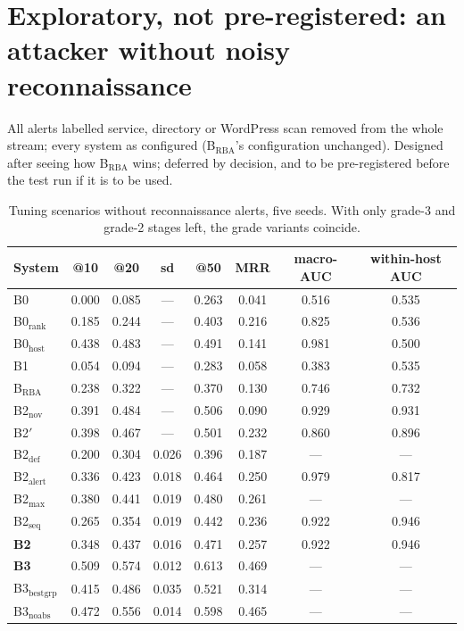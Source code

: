 \documentclass[10.5pt,a4paper]{article}
\begin{document}
\section{Exploratory, not pre-registered: an attacker without noisy reconnaissance}
All alerts labelled service, directory or WordPress scan removed from the whole stream; every system as configured (B$_\mathrm{RBA}$'s configuration unchanged). Designed after seeing how B$_\mathrm{RBA}$ wins; deferred by decision, and to be pre-registered before the test run if it is to be used.
\begin{table}[h]\centering\small
\caption{Tuning scenarios without reconnaissance alerts, five seeds. With only grade-3 and grade-2 stages left, the grade variants coincide.}
\label{tab:noscan}
\begin{tabular}{@{}l cccccc c@{}}
\toprule
System & @10 & @20 & sd & @50 & MRR & macro-AUC & within-host AUC \\
\midrule
B0 & 0.000 & 0.085 & --- & 0.263 & 0.041 & 0.516 & 0.535 \\
B0$_\mathrm{rank}$ & 0.185 & 0.244 & --- & 0.403 & 0.216 & 0.825 & 0.536 \\
B0$_\mathrm{host}$ & 0.438 & 0.483 & --- & 0.491 & 0.141 & 0.981 & 0.500 \\
B1 & 0.054 & 0.094 & --- & 0.283 & 0.058 & 0.383 & 0.535 \\
B$_\mathrm{RBA}$ & 0.238 & 0.322 & --- & 0.370 & 0.130 & 0.746 & 0.732 \\
B2$_\mathrm{nov}$ & 0.391 & 0.484 & --- & 0.506 & 0.090 & 0.929 & 0.931 \\
B2$'$ & 0.398 & 0.467 & --- & 0.501 & 0.232 & 0.860 & 0.896 \\
B2$_\mathrm{def}$ & 0.200 & 0.304 & 0.026 & 0.396 & 0.187 & --- & --- \\
B2$_\mathrm{alert}$ & 0.336 & 0.423 & 0.018 & 0.464 & 0.250 & 0.979 & 0.817 \\
B2$_\mathrm{max}$ & 0.380 & 0.441 & 0.019 & 0.480 & 0.261 & --- & --- \\
B2$_\mathrm{seq}$ & 0.265 & 0.354 & 0.019 & 0.442 & 0.236 & 0.922 & 0.946 \\
\textbf{B2} & 0.348 & 0.437 & 0.016 & 0.471 & 0.257 & 0.922 & 0.946 \\
\textbf{B3} & 0.509 & 0.574 & 0.012 & 0.613 & 0.469 & --- & --- \\
B3$_\mathrm{bestgrp}$ & 0.415 & 0.486 & 0.035 & 0.521 & 0.314 & --- & --- \\
B3$_\mathrm{noabs}$ & 0.472 & 0.556 & 0.014 & 0.598 & 0.465 & --- & --- \\
\bottomrule
\end{tabular}
\end{table}
\end{document}
